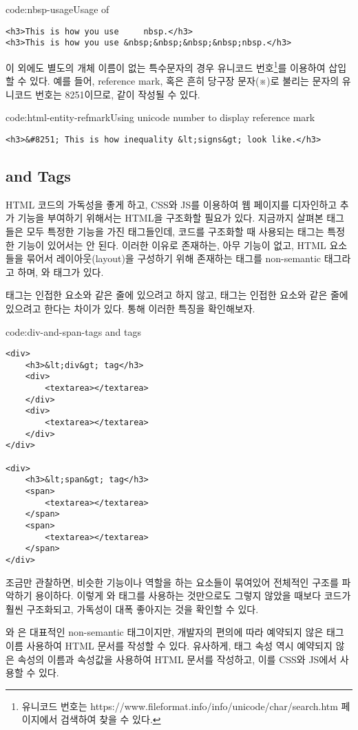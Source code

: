 \begin{codeenv}{code:nbsp-usage}{Usage of }\begin{verbatim}
<h3>This is how you use     nbsp.</h3>
<h3>This is how you use &nbsp;&nbsp;&nbsp;&nbsp;nbsp.</h3>
\end{verbatim}
\end{codeenv}

이 외에도 별도의 개체 이름이 없는 특수문자의 경우 유니코드 번호\footnote{유니코드 번호는 https://www.fileformat.info/info/unicode/char/search.htm 페이지에서 검색하여 찾을 수 있다.}를 이용하여 삽입할 수 있다. 예를 들어, reference mark, 혹은 흔히 당구장 문자(※)로 불리는 문자의 유니코드 번호는 8251이므로, \와 같이 작성될 수 있다.

\begin{codeenv}{code:html-entity-refmark}{Using unicode number to display reference mark}\begin{verbatim}
<h3>&#8251; This is how inequality &lt;signs&gt; look like.</h3>
\end{verbatim}
\end{codeenv}

\subsection*{ and  Tags}
HTML 코드의 가독성을 좋게 하고, CSS와 JS를 이용하여 웹 페이지를 디자인하고 추가 기능을 부여하기 위해서는 HTML을 구조화할 필요가 있다. 지금까지 살펴본 태그들은 모두 특정한 기능을 가진 태그들인데, 코드를 구조화할 때 사용되는 태그는 특정한 기능이 있어서는 안 된다. 이러한 이유로 존재하는, 아무 기능이 없고, HTML 요소들을 묶어서 레이아웃(layout)을 구성하기 위해 존재하는 태그를 non-semantic 태그라고 하며, 와  태그가 있다.

 태그는 인접한 요소와 같은 줄에 있으려고 하지 않고,  태그는 인접한 요소와 같은 줄에 있으려고 한다는 차이가 있다. \를 통해 이러한 특징을 확인해보자.

\begin{codeenv}{code:div-and-span-tags}{ and  tags}\begin{verbatim}
<div>
    <h3>&lt;div&gt; tag</h3>
    <div>
        <textarea></textarea>
    </div>
    <div>
        <textarea></textarea>
    </div>
</div>

<div>
    <h3>&lt;span&gt; tag</h3>
    <span>
        <textarea></textarea>
    </span>
    <span>
        <textarea></textarea>
    </span>
</div>
\end{verbatim}
\end{codeenv}

\를 조금만 관찰하면, 비슷한 기능이나 역할을 하는 요소들이 묶여있어 전체적인 구조를 파악하기 용이하다. 이렇게 와  태그를 사용하는 것만으로도 그렇지 않았을 때보다 코드가 훨씬 구조화되고, 가독성이 대폭 좋아지는 것을 확인할 수 있다.

와 은 대표적인 non-semantic 태그이지만, 개발자의 편의에 따라 예약되지 않은 태그 이름 사용하여 HTML 문서를 작성할 수 있다. 유사하게, 태그 속성 역시 예약되지 않은 속성의 이름과 속성값을 사용하여 HTML 문서를 작성하고, 이를 CSS와 JS에서 사용할 수 있다.
